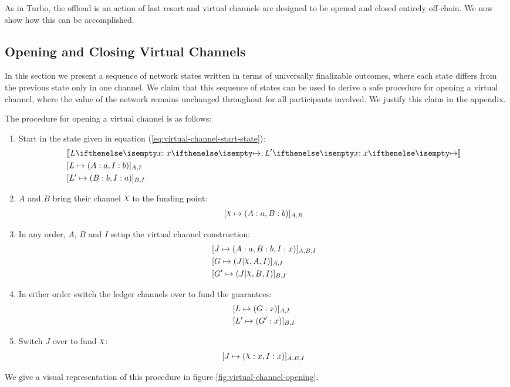 \documentclass{article}
\begin{document}
As in Turbo, the offload is an action of last resort and virtual channels are designed to be opened and closed entirely off-chain.
We now show how this can be accomplished.

\subsection{Opening and Closing Virtual Channels}\label{section:open-close-virtual-channel}

In this section we present a sequence of network states written in terms of universally finalizable outcomes, where each state differs from the previous state only in one channel.
We claim that this sequence of states can be used to derive a safe procedure for opening a virtual channel, where the value of the network remains unchanged throughout for all participants involved.
We justify this claim in the appendix.

The procedure for opening a virtual channel is as follows:
\begin{enumerate}
  \item Start in the state given in equation (\ref{eq:virtual-channel-start-state}):
  \begin{align}
    & \adj{\holds{L}{x}{}, \holds{L'}{x}{}}\\
    & \finalizable{L}{\alloc{A:a, I:b}}{A, I} \\
    & \finalizable{L'}{\alloc{B: b, I: a}}{B, I}
  \end{align}
  \item $A$ and $B$ bring their channel $\rchi$ to the funding point:
  \begin{align}
    \finalizable{\rchi}{\alloc{A:a, B:b}}{A,B}
  \end{align}
  \item In any order, $A$, $B$ and $I$ setup the virtual channel construction:
  \begin{align}
    & \finalizable{J}{\alloc{A:a, B:b, I: x}}{A, B, I} \\
    & \finalizable{G}{\guar{J}{\rchi, A, I}}{A, I} \\
    & \finalizable{G'}{\guar{J}{\rchi, B, I}}{B, I}
  \end{align}
  \item In either order switch the ledger channels over to fund the guarantees:
  \begin{align}
    & [L \mapsto ( G: x )]_{A,I} \\
    & [L' \mapsto ( G': x )]_{B,I}
  \end{align}
  \item Switch $J$ over to fund $\rchi$:
  \begin{align}
    \finalizable{J}{\alloc{\rchi: x, I: x}}{A, B, I}
  \end{align}
\end{enumerate}
We give a visual representation of this procedure in figure \ref{fig:virtual-channel-opening}.
\end{document}
